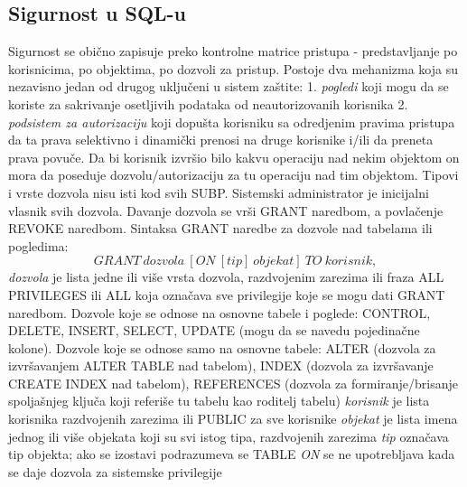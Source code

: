\documentclass{article}
\begin{document}
\subsection{Sigurnost u SQL-u}
Sigurnost se obično zapisuje preko kontrolne matrice pristupa -
predstavljanje po korisnicima, po objektima, po dozvoli za
pristup. Postoje dva mehanizma koja su nezavisno jedan od drugog
uključeni u sistem zaštite:
\newline \hspace*{0.4cm} 1. \textit{pogledi} koji mogu da se
koriste za sakrivanje osetljivih podataka od neautorizovanih
korisnika
\newline \hspace*{0.4cm} 2. \textit{podsistem za autorizaciju}
koji dopušta korisniku sa odredjenim pravima pristupa da ta
prava selektivno i dinamički prenosi na druge korisnike i/ili da
preneta prava povuče. Da bi korisnik izvršio bilo kakvu
operaciju nad nekim objektom on mora da poseduje
dozvolu/autorizaciju za tu operaciju nad tim objektom. Tipovi i
vrste dozvola nisu isti kod svih SUBP. Sistemski administrator
je inicijalni vlasnik svih dozvola. Davanje dozvola se vrši
GRANT naredbom, a povlačenje REVOKE naredbom.
\vspace{0.2cm} \newline
Sintaksa GRANT naredbe za dozvole nad tabelama ili pogledima:
\newline
$$GRANT\ dozvola\ [ON\ [tip]\ objekat]\ TO\ korisnik,$$
\textit{dozvola} je lista jedne ili više vrsta dozvola,
razdvojenim zarezima ili fraza ALL PRIVILEGES ili ALL koja
označava sve privilegije koje se mogu dati GRANT naredbom.
Dozvole koje se odnose na osnovne tabele i poglede: CONTROL,
DELETE, INSERT, SELECT, UPDATE (mogu da se navedu pojedinačne
kolone). Dozvole koje se odnose samo na osnovne tabele: ALTER
(dozvola za izvršavanjem ALTER TABLE nad tabelom), INDEX
(dozvola za izvršavanje CREATE INDEX nad tabelom), REFERENCES
(dozvola za formiranje/brisanje spoljašnjeg ključa koji referiše
tu tabelu kao roditelj tabelu)
\newline
\textit{korisnik} je lista korisnika razdvojenih zarezima ili
PUBLIC za sve korisnike
\newline
\textit{objekat} je lista imena jednog ili više objekata koji su
svi istog tipa, razdvojenih zarezima
\newline
\textit{tip} označava tip objekta; ako se izostavi podrazumeva 
se TABLE
\newline
\textit{ON} se ne upotrebljava kada se daje dozvola za sistemske
privilegije
\end{document}
